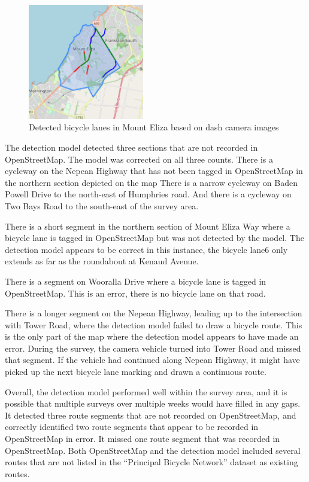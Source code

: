 \documentclass[11pt,twoside]{report}
\begin{document}
\begin{figure}[h]
\centering
\includegraphics[width=0.45\textwidth]{map2_3.png}
\caption{Detected bicycle lanes in Mount Eliza based on dash camera images}
\label{fig:rq3}
\end{figure}

The detection model detected three sections that are not recorded in OpenStreetMap.  The model was corrected on all three counts.  There is a cycleway on the Nepean Highway that has not been tagged in OpenStreetMap in the northern section depicted on the map  There is a narrow cycleway on Baden Powell Drive to the north-east of Humphries road.  And there is a cycleway on Two Bays Road to the south-east of the survey area.

There is a short segment in the northern section of Mount Eliza Way where a bicycle lane is tagged in OpenStreetMap but was not detected by the model.  The detection model appears to be correct in this instance, the bicycle lane6 only extends as far as the roundabout at Kenaud Avenue.

There is a segment on Wooralla Drive where a bicycle lane is tagged in OpenStreetMap.  This is an error, there is no bicycle lane on that road.

There is a longer segment on the Nepean Highway, leading up to the intersection with Tower Road, where the detection model failed to draw a bicycle route.  This is the only part of the map where the detection model appears to have made an error.  During the survey, the camera vehicle turned into Tower Road and missed that segment.  If the vehicle had continued along Nepean Highway, it might have picked up the next bicycle lane marking and drawn a continuous route.

Overall, the detection model performed well within the survey area, and it is possible that multiple surveys over multiple weeks would have filled in any gaps.  It detected three route segments that are not recorded on OpenStreetMap, and correctly identified two route segments that appear to be recorded in OpenStreetMap in error.  It missed one route segment that was recorded in OpenStreetMap.  Both OpenStreetMap and the detection model included several routes that are not listed in the ``Principal Bicycle Network'' dataset as existing routes.
\end{document}
